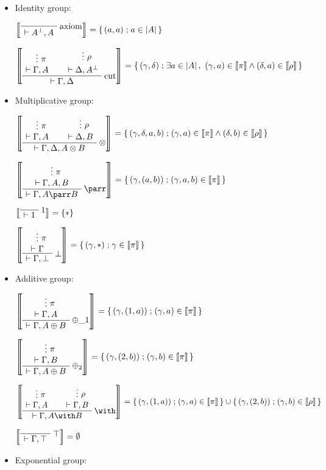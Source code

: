 \begin{itemize}
\item
  Identity group:

\(\sem{
\LabelRule{\rulename{axiom}}
\NulRule{ \vdash A\orth, A }
\DisplayProof}=\set{(a,a)}{a\in\web A}\)

\(\sem{
\AxRule{}
\VdotsRule{ \pi }{ \vdash \Gamma, A }
\AxRule{}
\VdotsRule{ \rho }{ \vdash \Delta, A\orth }
\LabelRule{ \rulename{cut} }
\BinRule{ \vdash \Gamma, \Delta }
\DisplayProof} = \set{(\gamma,\delta)}{\exists a\in\web A,\ (\gamma,a)\in\sem\pi\land(\delta,a)\in\sem\rho}\)

\item Multiplicative group:

\(\sem{
\AxRule{}
\VdotsRule{ \pi }{ \vdash \Gamma, A }
\AxRule{}
\VdotsRule{ \rho }{ \vdash \Delta, B }
\LabelRule{ \tens }
\BinRule{ \vdash \Gamma, \Delta, A \tens B }
\DisplayProof} =
\set{(\gamma,\delta,a,b)}{(\gamma,a)\in\sem\pi\land(\delta,b)\in\sem\rho}
\)

\(\sem{
\AxRule{ }
\VdotsRule{ \pi }{ \vdash \Gamma, A, B }
\LabelRule{ \parr }
\UnaRule{ \vdash \Gamma, A \parr B }
\DisplayProof} =  \set{(\gamma,(a,b))}{(\gamma,a,b)\in\sem\pi}\)

\(\sem{
\LabelRule{ \one }
\NulRule{ \vdash \one }
\DisplayProof} = \{ * \}\)

\(\sem{
\AxRule{}
\VdotsRule{ \pi }{ \vdash \Gamma }
\LabelRule{ \bot }
\UnaRule{ \vdash \Gamma, \bot }
\DisplayProof} = \set{(\gamma,*)}{\gamma\in\sem\pi}\)

\item Additive group:

\(\sem{ \AxRule{}
\VdotsRule{ \pi }{ \vdash \Gamma, A }
\LabelRule{ \plus\_1 }
\UnaRule{ \vdash \Gamma, A \plus B }
\DisplayProof} =
\set{(\gamma,(1,a))}{(\gamma,a)\in\sem\pi}
\)

\(\sem{
\AxRule{}
\VdotsRule{ \pi }{ \vdash \Gamma, B }
\LabelRule{ \plus_2 }
\UnaRule{ \vdash \Gamma, A \plus B }
\DisplayProof} = \set{(\gamma,(2,b))}{(\gamma,b)\in\sem\pi}\)

\(\sem{
\AxRule{}
\VdotsRule{ \pi }{ \vdash \Gamma, A }
\AxRule{}
\VdotsRule{ \rho }{ \vdash \Gamma, B }
\LabelRule{ \with }
\BinRule{ \vdash \Gamma, A \with B }
\DisplayProof} = \set{(\gamma,(1,a))}{(\gamma,a)\in\sem\pi} \cup \set{(\gamma,(2,b))}{(\gamma,b)\in\sem\rho}\)

\(\sem{
\LabelRule{ \top }
\NulRule{ \vdash \Gamma, \top }
\DisplayProof} = \emptyset\)

\item Exponential group:


\end{itemize}
